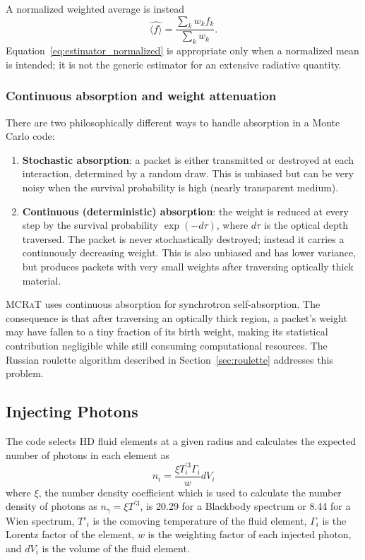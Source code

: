 \documentclass[12pt,a4paper]{article}
\newcommand{\mcrat}{\textsc{MCRaT}}
\begin{document}
A normalized weighted average is instead
\begin{equation}
	\widehat{\langle f\rangle}
	=
	\frac{\sum_k w_kf_k}
	{\sum_k w_k}.
	\label{eq:estimator_normalized}
\end{equation}
Equation~\eqref{eq:estimator_normalized} is appropriate only when a
normalized mean is intended; it is not the generic estimator for an
extensive radiative quantity.

\subsubsection{Continuous absorption and weight attenuation}

There are two philosophically different ways to handle absorption in a Monte
Carlo code:

\begin{enumerate}
	\item \textbf{Stochastic absorption}: a packet is either transmitted or
	destroyed at each interaction, determined by a random draw.  This is
	unbiased but can be very noisy when the survival probability is high
	(nearly transparent medium).
	
	\item \textbf{Continuous (deterministic) absorption}: the weight is
	reduced at every step by the survival probability $\exp(-d\tau)$, where
	$d\tau$ is the optical depth traversed.  The packet is never stochastically
	destroyed; instead it carries a continuously decreasing weight.  This is
	also unbiased and has lower variance, but produces packets with very small
	weights after traversing optically thick material.
\end{enumerate}

\mcrat{} uses continuous absorption for synchrotron self-absorption.  The
consequence is that after traversing an optically thick region, a packet's
weight may have fallen to a tiny fraction of its birth weight, making its
statistical contribution negligible while still consuming computational
resources.  The Russian roulette algorithm described in
Section~\ref{sec:roulette} addresses this problem.

\subsection{Injecting Photons} \label{inj}
The code selects HD fluid elements at a given radius and calculates the expected number of photons in each element as
\begin{equation} \label{n_density}
n_i=\frac{\xi T_i^{'3}\Gamma_i}{w}dV_i 
\end{equation} 
where $\xi$, the number density coefficient which is used to calculate the number density of photons as $n_\gamma=\xi T^{'3}$, is 20.29 for a Blackbody spectrum or 8.44 for a Wien spectrum, $T'_i$ is the comoving temperature of the fluid element, $\Gamma_i$ is the Lorentz factor of the element, $w$ is the weighting factor of each injected photon, and $dV_i$ is the volume of the fluid element. 
 
\end{document}
